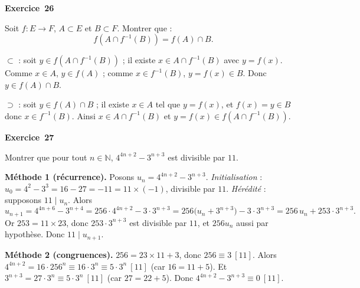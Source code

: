 \documentclass[11pt,a4paper]{article}
\begin{document}
	\medskip\noindent\textbf{\Large\color{bleu}Exercice~26}\nopagebreak
	\begin{enonce}
		Soit $f:E\to F$, $A\subset E$ et $B\subset F$. Montrer que :
		\[
		f\!\left(A\cap f^{-1}(B)\right)=f(A)\cap B.
		\]
	\end{enonce}
	\begin{corrige}
		\textbf{$\subset$} : soit $y\in f(A\cap f^{-1}(B))$ ; il existe $x\in A\cap f^{-1}(B)$ avec $y=f(x)$. Comme $x\in A$, $y\in f(A)$ ; comme $x\in f^{-1}(B)$, $y=f(x)\in B$. Donc $y\in f(A)\cap B$.
		
		\textbf{$\supset$} : soit $y\in f(A)\cap B$ ; il existe $x\in A$ tel que $y=f(x)$, et $f(x)=y\in B$ donc $x\in f^{-1}(B)$. Ainsi $x\in A\cap f^{-1}(B)$ et $y=f(x)\in f(A\cap f^{-1}(B))$.
	\end{corrige}
	
	\medskip\noindent\textbf{\Large\color{bleu}Exercice~27}\nopagebreak
	\begin{enonce}
		Montrer que pour tout $n\in\mathbb{N}$, $4^{4n+2}-3^{n+3}$ est divisible par $11$.
	\end{enonce}
	\begin{corrige}
		\textbf{Méthode 1 (récurrence).} Posons $u_n=4^{4n+2}-3^{n+3}$. \emph{Initialisation} : $u_0=4^2-3^3=16-27=-11=11\times(-1)$, divisible par $11$. \emph{Hérédité} : supposons $11\mid u_n$. Alors
		$$u_{n+1}=4^{4n+6}-3^{n+4}=256\cdot4^{4n+2}-3\cdot3^{n+3}=256\bigl(u_n+3^{n+3}\bigr)-3\cdot3^{n+3}=256\,u_n+253\cdot3^{n+3}.$$
		Or $253=11\times23$, donc $253\cdot3^{n+3}$ est divisible par $11$, et $256u_n$ aussi par hypothèse. Donc $11\mid u_{n+1}$.
		
		\textbf{Méthode 2 (congruences).} $256=23\times11+3$, donc $256\equiv3\ [11]$. Alors $4^{4n+2}=16\cdot256^n\equiv16\cdot3^n\equiv5\cdot3^n\ [11]$ (car $16=11+5$). Et $3^{n+3}=27\cdot3^n\equiv5\cdot3^n\ [11]$ (car $27=22+5$). Donc $4^{4n+2}-3^{n+3}\equiv0\ [11]$.
	\end{corrige}
	
\end{document}
